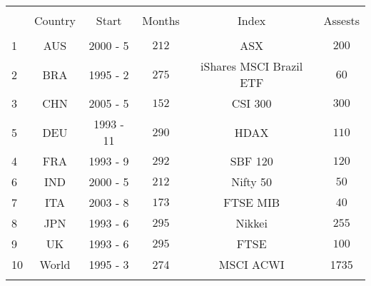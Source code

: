 \begin{tabular}{@{\extracolsep{5pt}} Hccccc} 
\hline \\[-1.8ex] 
 & Country & Start & Months & Index & Assests \\ 
\hline \\[-1.8ex] 
1 & AUS & 2000 - 5 & $212$& ASX & $200$ \\ 
2 & BRA & 1995 - 2 & $275$& iShares MSCI Brazil ETF& $60$ \\ 
3 & CHN & 2005 - 5 & $152$& CSI 300& $300$ \\ 
5 & DEU & 1993 - 11 & $290$& HDAX& $110$ \\
4 & FRA & 1993 - 9 & $292$& SBF 120& $120$ \\ 
6 & IND & 2000 - 5 & $212$& Nifty 50& $50$ \\ 
7 & ITA & 2003 - 8 & $173$& FTSE MIB& $40$ \\ 
8 & JPN & 1993 - 6 & $295$& Nikkei& $255$ \\ 
9 & UK & 1993 - 6 & $295$& FTSE& $100$ \\ 
10 & World & 1995 - 3 & 274 & MSCI ACWI & 1735\\
\hline \\[-1.8ex] 
\end{tabular} 